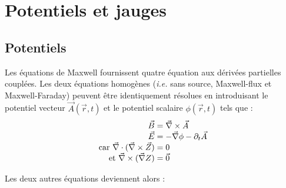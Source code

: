 \section{Potentiels et jauges}
\subsection{Potentiels}
	Les équations de Maxwell fournissent quatre équation aux dérivées partielles couplées. Les deux équations homogènes ({\it i.e.} sans source, Maxwell-flux et Maxwell-Faraday) peuvent être identiquement résolues en introduisant le potentiel vecteur $\vec{A}(\vec{r},t)$ et le potentiel scalaire $\phi(\vec{r},t)$ tels que :
$$
	\begin{array}{r@{\;}l}
		\vec{B}&=\nab\times\vec{A}\\
		\vec{E}&=-\nab\phi-\partial_t\vec{A}\\
		\text{car } \nab\cdot(\nab\times\vec{Z})&=0\\
		\text{et }\nab\times(\nab Z)&=\vec{0}
	\end{array}
$$
	
	Les deux autres équations deviennent alors :
	
